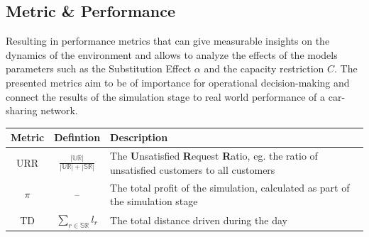 \subsection{Metric \& Performance}
\label{sub_sec:Method/Metrics}

Resulting in performance metrics that can give measurable insights on the dynamics of the environment and
allows to analyze the effects of the models parameters such as the Substitution Effect $\alpha$ and the
capacity restriction $C$. The presented metrics aim to be of importance for operational decision-making
and connect the results of the simulation stage to real world performance of a car-sharing network.

\vspace*{4ex}
\renewcommand\tabularxcolumn[1]{m{#1}}
\renewcommand{\arraystretch}{1.6}
\begin{center}
\centering
\begin{tabularx}{0.9\linewidth}{@{}c|c|X@{}}
  \textbf{Metric} & \textbf{Defintion} & \textbf{Description} \\
  \hline
  URR & $\frac{|\mathbb{UR}|}{|\mathbb{UR}| + |\mathbb{SR}|}$ & The \textbf{U}nsatisfied \textbf{R}equest \textbf{R}atio, eg. the ratio of unsatisfied customers to all customers \\
  $\pi$ & {--} & The total profit of the simulation, calculated as part of the simulation stage \\
  TD & $\sum_{r \in \mathbb{SR}} l_r$ & The total distance driven during the day \\
\end{tabularx}
\end{center}

\renewcommand{\arraystretch}{1}

